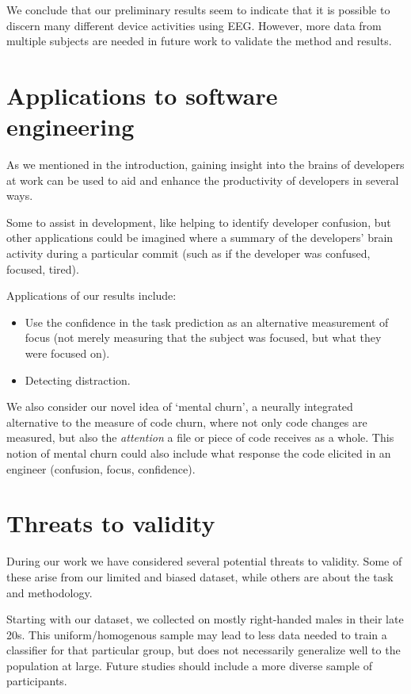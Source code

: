 We conclude that our preliminary results seem to indicate that it is possible to discern many different device activities using EEG\@. However, more data from multiple subjects are needed in future work to validate the method and results. 

\section{Applications to software engineering}

As we mentioned in the introduction, gaining insight into the brains of developers at work can be used to aid and enhance the productivity of developers in several ways.

Some to assist in development, like helping to identify developer confusion, but other applications could be imagined where a summary of the developers' brain activity during a particular commit (such as if the developer was confused, focused, tired).


Applications of our results include:

\begin{itemize}
    \item Use the confidence in the task prediction as an alternative measurement of focus (not merely measuring that the subject was focused, but what they were focused on). 
    \item Detecting distraction.
\end{itemize}

We also consider our novel idea of `mental churn', a neurally integrated alternative to the measure of code churn, where not only code changes are measured, but also the \emph{attention} a file or piece of code receives as a whole. This notion of mental churn could also include what response the code elicited in an engineer (confusion, focus, confidence).

\section{Threats to validity}\label{section:threats}

    During our work we have considered several potential threats to validity. Some of these arise from our limited and biased dataset, while others are about the task and methodology.

    Starting with our dataset, we collected on mostly right-handed males in their late 20s. This uniform/homogenous sample may lead to less data needed to train a classifier for that particular group, but does not necessarily generalize well to the population at large. Future studies should include a more diverse sample of participants.

